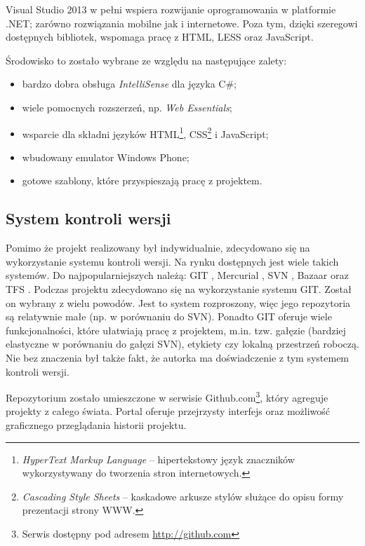 \documentclass[a4paper]{book}
\begin{document}
			Visual Studio 2013 w pełni wspiera rozwijanie oprogramowania w platformie .NET; zarówno rozwiązania mobilne jak i internetowe. Poza tym, dzięki szeregowi dostępnych bibliotek, wspomaga pracę z HTML, LESS oraz JavaScript.
			
			Środowisko to zostało wybrane ze względu na następujące zalety:
			\begin{itemize}
				\item bardzo  dobra obsługa \textit{IntelliSense} dla języka C\#;
				\item wiele pomocnych rozszerzeń, np. \textit{Web Essentials};
				\item wsparcie dla składni języków HTML\footnote{\emph{HyperText Markup Language} -- hipertekstowy język znaczników wykorzystywany do tworzenia stron internetowych.}, CSS\footnote{\emph{Cascading Style Sheets} -- kaskadowe arkusze stylów służące do opisu formy prezentacji strony WWW.} i JavaScript;
				\item wbudowany emulator Windows Phone;
				\item gotowe szablony, które przyspieszają pracę z projektem.
			\end{itemize}
			
			\subsection{System kontroli wersji}
			
			Pomimo że projekt realizowany był indywidualnie, zdecydowano się na wykorzystanie systemu kontroli wersji. Na rynku dostępnych jest wiele takich systemów. Do najpopularniejszych należą: GIT \cite{id:GIT}, Mercurial \cite{id:Mecurial}, SVN \cite{id:SVN}, Bazaar \cite{id:Bazaar} oraz TFS \cite{id:TFS}.
			Podczas projektu zdecydowano się na wykorzystanie systemu GIT. Został on wybrany z wielu powodów. Jest to system rozproszony, więc jego repozytoria są relatywnie małe (np. w porównaniu do SVN). Ponadto GIT oferuje wiele funkcjonalności, które ułatwiają pracę z projektem, m.in. tzw. gałęzie (bardziej elastyczne w porównaniu do gałęzi SVN), etykiety czy lokalną przestrzeń roboczą. Nie bez znaczenia był także fakt, że autorka ma doświadczenie z tym systemem kontroli wersji.

			Repozytorium zostało umieszczone w serwisie Github.com\footnote{Serwis dostępny pod adresem \url{http://github.com}}, który agreguje projekty z całego świata. Portal oferuje przejrzysty interfejs oraz możliwość graficznego przeglądania historii projektu.
		
\end{document}
